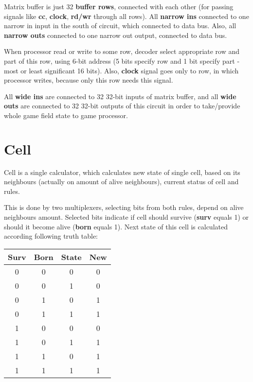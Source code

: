 Matrix buffer is just 32 \textbf{buffer rows}, connected with each other (for passing signals like \textbf{cc}, \textbf{clock}, \textbf{rd/wr} through all rows). All \textbf{narrow ins} connected to one narrow in input in the south of circuit, which connected to data bus. Also, all \textbf{narrow outs} connected to one narrow out output, connected to data bus.

When processor read or write to some row, decoder select appropriate row and part of this row, using 6-bit address (5 bits specify row and 1 bit specify part - most or least significant 16 bits). Also, \textbf{clock} signal goes only to row, in which processor writes, because only this row needs this signal.

All \textbf{wide ins} are connected to 32 32-bit inputs of matrix buffer, and all \textbf{wide outs} are connected to 32 32-bit outputs of this circuit in order to take/provide whole game field state to game processor.

\section*{Cell}

Cell is a single calculator, which calculates new state of single cell, based on its neighbours (actually on amount of alive neighbours), current status of cell and rules.

This is done by two multiplexers, selecting bits from both rules, depend on alive neighbours amount. Selected bits indicate if cell should survive (\textbf{surv} equals 1) or should it become alive (\textbf{born} equals 1). Next state of this cell is calculated according following truth table:

\begin{center}
	\begin{tabular}{|c|c|c|c|}
		\hline
		Surv & Born & State & New \\
		\hline
		0 & 0 & 0 & 0  \\
		\hline
		0 & 0 & 1 & 0 \\
		\hline
		0 & 1 & 0 & 1 \\
		\hline
		0 & 1 & 1 & 1 \\
		\hline
		1 & 0 & 0 & 0 \\
		\hline
		1 & 0 & 1 & 1 \\
		\hline
		1 & 1 & 0 & 1 \\
		\hline
		1 & 1 & 1 & 1 \\
		\hline
	\end{tabular}
\end{center}

